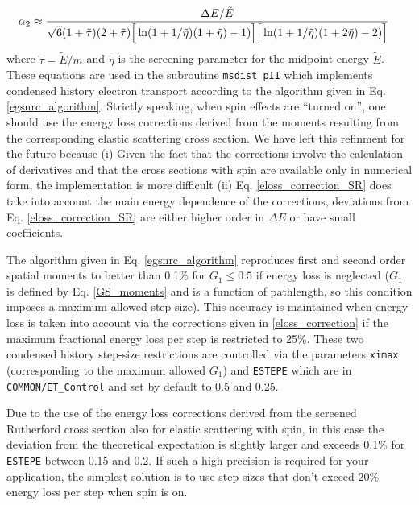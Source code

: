 \begin{itemize}
\begin{equation}
\begin{split}
\\
\alpha_2 & \approx {\Delta E/\tilde{E} \over \sqrt{6} (1 + \tilde{\tau}) 
(2 + \tilde{\tau}) \Big[
\ln(1 + 1/\tilde{\eta}) (1 + \tilde{\eta}) - 1) \Big] 
\Big[ \ln(1 + 1/\tilde{\eta}) (1 + 2 \tilde{\eta}) - 2) \Big] }
\end{split}
\end{equation}
where $\tilde{\tau} = \tilde{E}/m$ and 
$\tilde{\eta}$ is the screening parameter for 
the midpoint energy $\tilde{E}$. 
These equations are used in the subroutine {\tt msdist\_pII} 
which implements condensed history electron transport according 
to the algorithm given in Eq. \eqref{egsnrc_algorithm}. 
Strictly speaking, when spin effects are ``turned on'', one 
should use the energy loss corrections derived 
from the moments resulting from the corresponding elastic scattering 
cross section. We have left this refinment for the future because 
(i) Given the fact that the corrections involve the calculation 
of derivatives and that the cross sections with spin are 
available only in numerical form, the implementation is more 
difficult (ii) Eq. \eqref{eloss_correction_SR} does take into 
account the main energy dependence of the corrections, deviations 
from Eq. \eqref{eloss_correction_SR} are either higher order 
in $\Delta E$ or have small coefficients. 

The algorithm given in Eq. \eqref{egsnrc_algorithm} reproduces 
first and second order spatial moments to better than 0.1\% for 
$G_1 \le 0.5$ if energy loss is neglected ($G_1$ is defined by Eq.
\eqref{GS_moments} and is a function of pathlength, so this condition
imposes a maximum allowed step size). This accuracy 
is maintained when energy loss is taken into account via 
the corrections given in \eqref{eloss_correction} if 
the maximum fractional energy loss per step is 
restricted to 25\%. These two condensed history 
step-size restrictions are controlled via the 
parameters {\tt ximax} (corresponding to the maximum allowed $G_1$) 
and {\tt ESTEPE} which are in {\tt COMMON/ET\_Control} and set by default 
to 0.5 and 0.25. 

Due to the use of the energy loss corrections derived from the 
screened Rutherford cross section also for elastic scattering 
with spin, in this case the deviation from the theoretical expectation 
is slightly larger and exceeds 0.1\% for {\tt ESTEPE} between 
0.15 and 0.2. If such a high precision is required for 
your application, the simplest solution is to use step sizes 
that don't exceed 20\% energy loss per step when spin is on.
\end{itemize}

